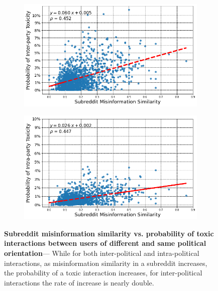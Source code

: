 \begin{figure}
\begin{subfigure}{.49\textwidth}
  \centering
\includegraphics[width=1\linewidth]{figures/subreddit_misinformation_interparty.png}
\label{fig:misinformation-interparty}
\end{subfigure}%
\begin{subfigure}{.49\textwidth}
  \centering
\includegraphics[width=1\linewidth]{figures/subreddit_misinformation_intraparity_toxicity.png}
  \label{fig:misinformation-intrapary}
\end{subfigure}

\caption{\textbf{Subreddit misinformation similarity vs. probability of toxic interactions between users of different and same political orientation}--- While for both inter-political and intra-political interactions, as misinformation similarity in a subreddit increases, the probability of a toxic interaction increases, for inter-political interactions the rate of increase is nearly double. }
\label{fig:subreddit-misinformation-rate-toxictiy-rate}
\end{figure}


